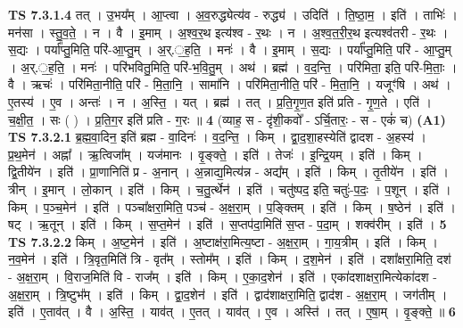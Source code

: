 \documentclass[17pt]{extarticle}
\begin{document}
                  \newline
                                \textbf{ TS 7.3.1.4} \newline
                  तत् । उ॒भय᳚म् । आ॒प्त्वा । अ॒व॒रुद्ध्येत्य॑व - रुद्ध्य॑ । उदिति॑ । ति॒ष्ठा॒म॒ । इति॑ । ताभिः॑ । मन॑सा । स्तु॒व॒ते॒ । न । वै । इ॒माम् । अ॒श्व॒र॒थ इत्य॑श्व - र॒थः । न । अ॒श्व॒त॒री॒र॒थ इत्यश्व॑तरी - र॒थः । स॒द्यः । पर्या᳚प्तु॒मिति॒ परि॑-आ॒प्तु॒म् । अ॒र्.॒ह॒ति॒ । मनः॑ । वै । इ॒माम् । स॒द्यः । पर्या᳚प्तु॒मिति॒ परि॑ - आ॒प्तु॒म् । अ॒र्.॒ह॒ति॒ । मनः॑ । परि॑भवितु॒मिति॒ परि॑-भ॒वि॒तु॒म् । अथ॑ । ब्रह्म॑ । व॒द॒न्ति॒ । परि॑मिता॒ इति॒ परि॑-मि॒ताः॒ । वै । ऋचः॑ । परि॑मिता॒नीति॒ परि॑ - मि॒ता॒नि॒ । सामा॑नि । परि॑मिता॒नीति॒ परि॑ - मि॒ता॒नि॒ । यजूꣳ॑षि । अथ॑ । ए॒तस्य॑ । ए॒व । अन्तः॑ । न । अ॒स्ति॒ । यत् । ब्रह्म॑ । तत् । प्र॒ति॒गृ॒ण॒त इति॑ प्रति - गृ॒ण॒ते । एति॑ । च॒क्षी॒त॒ । सः ( ) । प्र॒ति॒ग॒र इति॑ प्रति - ग॒रः ॥ \textbf{  4} \newline
                  \newline
                      (व्याह॒ स - दृ॑शी॒कवो᳚ - ऽर्चि॒तारः॒ - स - एकं॑ च)  \textbf{(A1)} \newline \newline
                                \textbf{ TS 7.3.2.1} \newline
                  ब्र॒ह्म॒वा॒दिन॒ इति॑ ब्रह्म - वा॒दिनः॑ । व॒द॒न्ति॒ । किम् । द्वा॒द॒शा॒हस्येति॑ द्वादश - अ॒हस्य॑ । प्र॒थ॒मेन॑ । अह्ना᳚ । ऋ॒त्विजा᳚म् । यज॑मानः । वृ॒ङ्क्ते॒ । इति॑ । तेजः॑ । इ॒न्द्रि॒यम् । इति॑ । किम् । द्वि॒तीये॑न । इति॑ । प्रा॒णानिति॑ प्र - अ॒नान् । अ॒न्नाद्य॒मित्य॑न्न - अद्य᳚म् । इति॑ । किम् । तृ॒तीये॑न । इति॑ । त्रीन् । इ॒मान् । लो॒कान् । इति॑ । किम् । च॒तु॒र्त्थेन॑ । इति॑ । चतु॑ष्पद॒ इति॒ चतुः॑-प॒दः॒ । प॒शून् । इति॑ । किम् । प॒ञ्च॒मेन॑ । इति॑ । पञ्चा᳚क्षरा॒मिति॒ पञ्च॑ - अ॒क्ष॒रा॒म् । प॒ङ्क्तिम् । इति॑ । किम् । ष॒ष्ठेन॑ । इति॑ । षट् । ऋ॒तून् । इति॑ । किम् । स॒प्त॒मेन॑ । इति॑ । स॒प्तप॑दा॒मिति॑ स॒प्त - प॒दा॒म् । शक्व॑रीम् । इति॑ । \textbf{  5} \newline
                  \newline
                                \textbf{ TS 7.3.2.2} \newline
                  किम् । अ॒ष्ट॒मेन॑ । इति॑ । अ॒ष्टाक्ष॑रा॒मित्य॒ष्टा - अ॒क्ष॒रा॒म् । गा॒य॒त्रीम् । इति॑ । किम् । न॒व॒मेन॑ । इति॑ । त्रि॒वृत॒मिति॑ त्रि - वृत᳚म् । स्तोम᳚म् । इति॑ । किम् । द॒श॒मेन॑ । इति॑ । दशा᳚क्षरा॒मिति॒ दश॑ - अ॒क्ष॒रा॒म् । वि॒राज॒मिति॑ वि - राज᳚म् । इति॑ । किम् । ए॒का॒द॒शेन॑ । इति॑ । एका॑दशाक्षरा॒मित्येका॑दश - अ॒क्ष॒रा॒म् । त्रि॒ष्टुभ᳚म् । इति॑ । किम् । द्वा॒द॒शेन॑ । इति॑ । द्वाद॑शाक्षरा॒मिति॒ द्वाद॑श - अ॒क्ष॒रा॒म् । जग॑तीम् । इति॑ । ए॒ताव॑त् । वै । अ॒स्ति॒ । याव॑त् । ए॒तत् । याव॑त् । ए॒व । अस्ति॑ । तत् । ए॒षा॒म् । वृ॒ङ्क्ते॒ ॥ \textbf{  6} \newline
\end{document}
